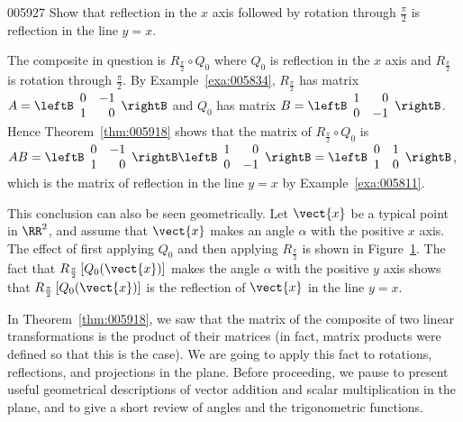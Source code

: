 \begin{example}{}{005927}
Show that reflection in the $x$ axis followed by rotation through $\frac{\pi}{2}$ is reflection in the line $y = x$.

\begin{solution}
  The composite in question is $R_{\frac{\pi}{2}} \circ Q_{0}$ where $Q_{0}$ is reflection in the $x$ axis and $R_{\frac{\pi}{2}}$ is rotation through $\frac{\pi}{2}$. By Example~\ref{exa:005834}, $R_{\frac{\pi}{2}}$ has matrix $A = \leftB \begin{array}{rr}
 0 & -1 \\
 1 & 0
 \end{array} \rightB$
 and $Q_{0}$ has matrix $B = \leftB \begin{array}{rr}
 1 & 0 \\
 0 & -1
 \end{array} \rightB$.
 Hence Theorem~\ref{thm:005918} shows that the matrix of $R_{\frac{\pi}{2}} \circ Q_{0}$
 is $AB = \leftB \begin{array}{rr}
 0 & -1 \\
 1 & 0
 \end{array} \rightB \leftB \begin{array}{rr}
 1 & 0 \\
 0 & -1
 \end{array} \rightB = \leftB \begin{array}{rr}
 0 & 1 \\
 1 & 0
 \end{array} \rightB$, which is the matrix of reflection in the line $y = x$ by Example~\ref{exa:005811}.
\end{solution}
\end{example}

This conclusion can also be seen geometrically. Let $\vect{x}$ be a typical point in $\RR^2$, and assume that $\vect{x}$ makes an angle $\alpha$ with the positive $x$ axis. The effect of first applying $Q_{0}$ and then applying $R_{\frac{\pi}{2}}$ is shown in Figure~\ref{fig:005950}. The fact that $R_{\frac{\pi}{2}}\left[Q_{0}(\vect{x})\right]$ makes the angle $\alpha$ with the positive $y$ axis shows that $R_{\frac{\pi}{2}}\left[Q_{0}(\vect{x})\right]$ is the reflection of $\vect{x}$ in the line $y = x$.

\begin{figure}[H]
\vspace*{-1em}
\centering

\caption{\label{fig:005950}}
\end{figure}
\vspace{-1em}
In Theorem~\ref{thm:005918}, we saw that the matrix of the composite of two linear transformations is the product of their matrices (in fact, matrix products were defined so that this is the case). We are going to apply this fact to rotations, reflections, and projections in the plane. Before proceeding, we pause to present useful geometrical descriptions of vector addition and scalar multiplication in the plane, and to give a short review of angles and the trigonometric functions.


